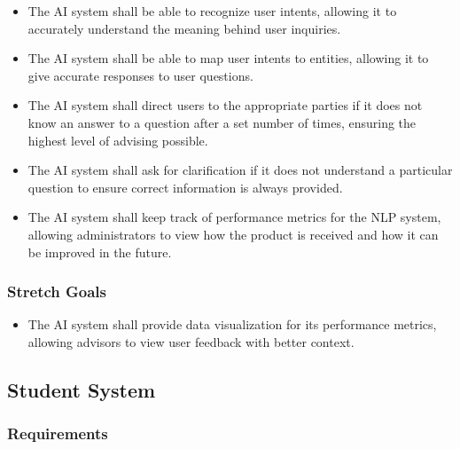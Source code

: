 \documentclass[titlepage, 12pt]{article}
\begin{document}
\begin{itemize}
    \item The AI system shall be able to recognize user intents, allowing it to accurately understand the meaning behind user inquiries.
    \item The AI system shall be able to map user intents to entities, allowing it to give accurate responses to user questions.
    \item The AI system shall direct users to the appropriate parties if it does not know an answer to a question after a set number of times, ensuring the highest level of advising possible.
    \item The AI system shall ask for clarification if it does not understand a particular question to ensure correct information is always provided.
    \item The AI system shall keep track of performance metrics for the NLP system, allowing administrators to view how the product is received and how it can be improved in the future.
\end{itemize}

\subsubsection{Stretch Goals}

\begin{itemize}
    \item The AI system shall provide data visualization for its performance metrics, allowing advisors to view user feedback with better context.
\end{itemize}

\subsection{Student System}

\subsubsection{Requirements}
\end{document}
